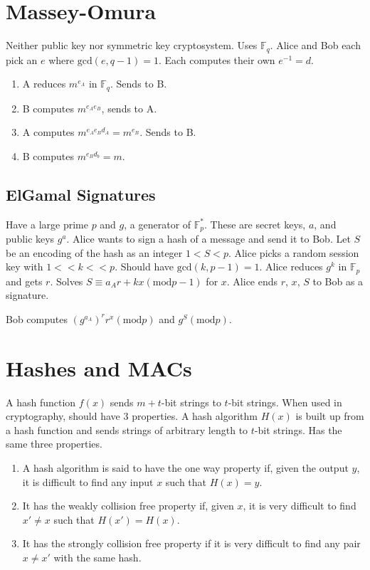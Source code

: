 \documentclass{article}
\begin{document}
\section{Massey-Omura}
Neither public key nor symmetric key cryptosystem. Uses $\mathbb{F}_q$. Alice
and Bob each pick an $e$ where $\text{gcd}(e,q-1) = 1$. Each computes their own
$e^{-1} = d$.

\begin{enumerate}
  \item A reduces $m^{e_A}$ in $\mathbb{F}_q$. Sends to B.
  \item B computes $m^{e_Ae_B}$, sends to A.
  \item A computes $m^{e_Ae_Bd_A} = m^{e_B}$. Sends to B.
  \item B computes $m^{e_Bd_b} = m$.
\end{enumerate}

\subsection{ElGamal Signatures}
Have a large prime $p$ and $g$, a generator of $\mathbb{F}_p^*$. These are
secret keys, $a$, and public keys $g^a$. Alice wants to sign a hash of a
message and send it to Bob. Let $S$ be an encoding of the hash as an integer
$1<S<p$. Alice picks a random session key with $1<<k<<p$. Should have
$\text{gcd}(k,p-1)=1$. Alice reduces $g^k$ in $\mathbb{F}_p$ and gets $r$.
Solves $S \equiv a_Ar+kx(\text{mod}p-1)$ for $x$. Alice ends $r$, $x$, $S$ to
Bob as a signature.

Bob computes $(g^{a_A})^rr^x(\text{mod}p)$ and $g^S(\text{mod}p)$.

\section{Hashes and MACs}
A hash function $f(x)$ sends $m+t$-bit strings to $t$-bit strings. When used
in cryptography, should have 3 properties. A hash algorithm $H(x)$ is built up
from a hash function and sends strings of arbitrary length to $t$-bit strings.
Has the same three properties.

\begin{enumerate}
  \item A hash algorithm is said to have the one way property if, given the
    output $y$, it is difficult to find any input $x$ such that $H(x)=y$.
  \item It has the weakly collision free property if, given $x$, it is very
    difficult to find $x' \neq x$ such that $H(x')=H(x)$.
  \item It has the strongly collision free property if it is very difficult to
    find any pair $x \neq x'$ with the same hash.
\end{enumerate}
\end{document}
